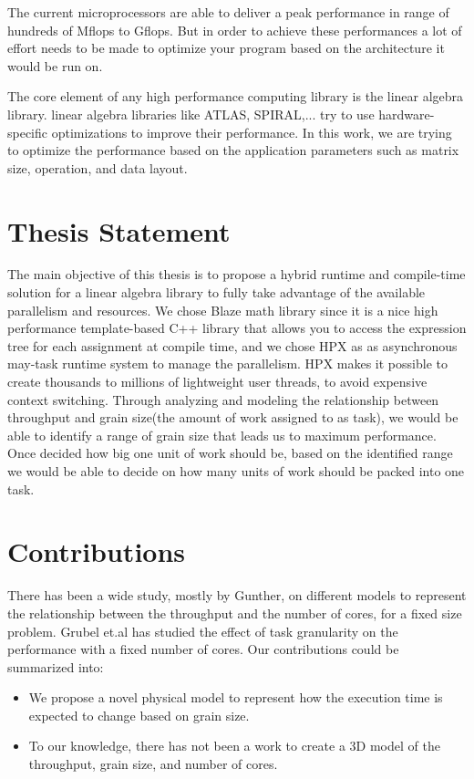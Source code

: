 The current microprocessors are able to deliver a peak performance in range of hundreds of Mflops to Gflops. But in order to achieve these performances a lot of effort needs to be made to optimize your program based on the architecture it would be run on\cite{whaley1998automatically}. 

The core element of any high performance computing library is the linear algebra library. linear algebra libraries like ATLAS, SPIRAL,... try to use hardware-specific optimizations to improve their performance. In this work, we are trying to optimize the performance based on the application parameters such as matrix size, operation, and data layout.   


\vspace{\baselineskip}
\section{Thesis Statement}
The main objective of this thesis is to propose a hybrid runtime and compile-time solution for a linear algebra library to fully take advantage of the available parallelism and resources. We chose Blaze math library since it is a nice high performance template-based C++ library that allows you to access the expression tree for each assignment at compile time, and we chose HPX as as asynchronous may-task runtime system to manage the parallelism. HPX makes it possible to create thousands to millions of lightweight user threads, to avoid expensive context switching. 
Through analyzing and modeling the relationship between throughput and grain size(the amount of work assigned to as task), we would be able to identify a range of grain size that leads us to maximum performance. Once decided how big one unit of work should be, based on the identified range we would be able to decide on how many units of work should be packed into one task.
 
\vspace{\baselineskip}
\section{Contributions}
There has been a wide study, mostly by Gunther\cite{gunther2000practical,gunther2002new,gunther2007guerrilla,gunther2011new}, on different models to represent the relationship between the throughput and the number of cores, for a fixed size problem. 
Grubel et.al\cite{grubel2015performance} has studied the effect of task granularity on the performance with a fixed number of cores. 
Our contributions could be summarized into:
\begin{itemize}
	\item{We propose a novel physical model to represent how the execution time is expected to change based on grain size.}
	\item{To our knowledge, there has not been a work to create a 3D model of the throughput, grain size, and number of cores.} 
\end{itemize}
 

